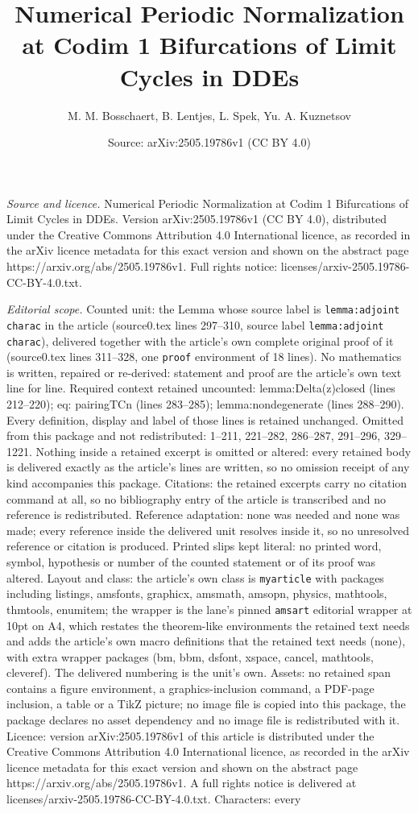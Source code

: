 \documentclass[10pt,a4paper]{amsart}
\title[Numerical Periodic Normalization at Codim 1 Bifurcations of ]{Numerical Periodic Normalization at Codim 1 Bifurcations of Limit Cycles in DDEs}
\author{M. M. Bosschaert, B. Lentjes, L. Spek, Yu. A. Kuznetsov}
\date{Source: arXiv:2505.19786v1 (CC BY 4.0)}
\begin{document}
\maketitle

\noindent\emph{Source and licence.} Numerical Periodic Normalization at Codim 1 Bifurcations of Limit Cycles in DDEs. Version arXiv:2505.19786v1 (CC BY 4.0), distributed under the Creative Commons Attribution 4.0 International licence, as recorded in the arXiv licence metadata for this exact version and shown on the abstract page https://arxiv.org/abs/2505.19786v1. Full rights notice: licenses/arxiv-2505.19786-CC-BY-4.0.txt.\par\smallskip

\noindent\textit{Editorial scope.} Counted unit: the Lemma whose source label is \texttt{lemma:adjoint charac} in the article (source0.tex lines 297--310, source label \texttt{lemma:adjoint charac}), delivered together with the article's own complete original proof of it (source0.tex lines 311--328, one \texttt{proof} environment of 18 lines). No mathematics is written, repaired or re-derived: statement and proof are the article's own text line for line. Required context retained uncounted: lemma:Delta(z)closed (lines 212--220); eq: pairingTCn (lines 283--285); lemma:nondegenerate (lines 288--290). Every definition, display and label of those lines is retained unchanged. Omitted from this package and not redistributed: 1--211, 221--282, 286--287, 291--296, 329--1221. Nothing inside a retained excerpt is omitted or altered: every retained body is delivered exactly as the article's lines are written, so no omission receipt of any kind accompanies this package. Citations: the retained excerpts carry no citation command at all, so no bibliography entry of the article is transcribed and no reference is redistributed. Reference adaptation: none was needed and none was made; every reference inside the delivered unit resolves inside it, so no unresolved reference or citation is produced. Printed slips kept literal: no printed word, symbol, hypothesis or number of the counted statement or of its proof was altered. Layout and class: the article's own class is \texttt{myarticle} with packages including listings, amsfonts, graphicx, amsmath, amsopn, physics, mathtools, thmtools, enumitem; the wrapper is the lane's pinned \texttt{amsart} editorial wrapper at 10pt on A4, which restates the theorem-like environments the retained text needs and adds the article's own macro definitions that the retained text needs (none), with extra wrapper packages (bm, bbm, dsfont, xspace, cancel, mathtools, cleveref). The delivered numbering is the unit's own. Assets: no retained span contains a figure environment, a graphics-inclusion command, a PDF-page inclusion, a table or a TikZ picture; no image file is copied into this package, the package declares no asset dependency and no image file is redistributed with it. Licence: version arXiv:2505.19786v1 of this article is distributed under the Creative Commons Attribution 4.0 International licence, as recorded in the arXiv licence metadata for this exact version and shown on the abstract page https://arxiv.org/abs/2505.19786v1. A full rights notice is delivered at licenses/arxiv-2505.19786-CC-BY-4.0.txt. Characters: every 
\end{document}
